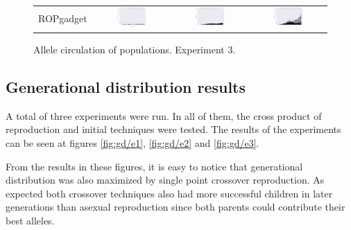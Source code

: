 \documentclass{article}
\begin{document}
\begin{landscape}
\begin{figure}[t]
\begin{center}
\begin{tabular}{c c c c}
    ROPgadget & \includegraphics[align=c,width=0.42\textwidth]{ac/e3/4} & \includegraphics[align=c,width=0.42\textwidth]{ac/e3/5} & \includegraphics[align=c,width=0.42\textwidth]{ac/e3/6} \\
\end{tabular}
\end{center}
\caption{Allele circulation of populations. Experiment 3.}
\label{fig:ac/e3}
\end{figure}
\end{landscape}
\restoregeometry
\pagestyle{plain}

\subsection{Generational distribution results}
A total of three experiments were run. In all of them, the cross product of reproduction and initial techniques were tested. The results of the experiments can be seen at figures \ref{fig:gd/e1}, \ref{fig:gd/e2} and \ref{fig:gd/e3}.

From the results in these figures, it is easy to notice that generational distribution was also maximized by single point crossover reproduction. As expected both crossover techniques also had more successful children in later generations than asexual reproduction since both parents could contribute their best alleles.
\end{document}
